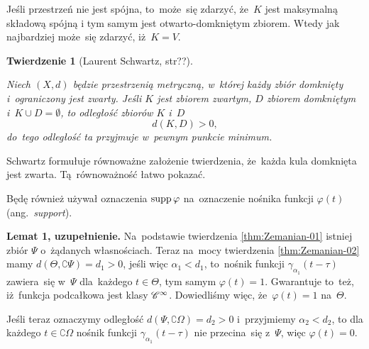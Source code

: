\documentclass[a4paper,11pt]{article}
\numberwithin{equation}{section}
\newtheorem{theorem}{Twierdzenie}
\begin{document}
Jeśli przestrzeń nie jest spójna, to~może~się zdarzyć, że~$K$ jest
maksymalną składową spójną i tym samym jest otwarto-domkniętym
zbiorem. Wtedy jak najbardziej może~się zdarzyć, iż~$K = V$.





\begin{theorem}[Laurent Schwartz,
  str??\cite{SchwartzKursAnalizyMatematycznejVolI1979}]
  \label{thm:Zemanian-02}

  Niech $( X, d )$ będzie przestrzenią metryczną, w~której każdy zbiór
  domknięty i~ograniczony jest zwarty. Jeśli $K$ jest zbiorem zwartym,
  $D$ zbiorem domkniętym i~$K \cup D = \emptyset$, to odległość zbiorów $K$
  i~$D$
  \begin{equation}
    \label{eq:Zem-s01-05}
    d( K, D ) > 0,
  \end{equation}
  do~tego odległość ta przyjmuje w~pewnym punkcie minimum.

\end{theorem}





\noindent
Schwartz formułuje równoważne założenie twierdzenia, że~każda
kula domknięta jest zwarta. Tą~równoważność łatwo pokazać.

Będę również używał oznaczenia $\operatorname{supp} \varphi$ na~oznaczenie nośnika
funkcji $\varphi( t )$ (ang.~\textit{support}).

\VerSpaceFour





\noindent
{} \textbf{Lemat 1, uzupełnienie.} Na~podstawie twierdzenia
\eqref{thm:Zemanian-01} istniej zbiór $\Psi$ o~żądanych własnościach. Teraz
na~mocy twierdzenia \eqref{thm:Zemanian-02} mamy
$d( \Theta, \complement \Psi ) = d_{ 1 } > 0$, jeśli więc $\alpha_{ 1 } < d_{ 1 }$, to~nośnik funkcji
$\gamma_{ \alpha_{ 1 } }( t - \tau )$ zawiera~się w~$\Psi$ dla~każdego $t \in \Theta$, tym samym
$\varphi( t ) = 1$. Gwarantuje to~też, iż~funkcja podcałkowa jest klasy
$\mathcal{C}^{ \infty }$. Dowiedliśmy więc, że~$\varphi( t ) = 1$ na~$\Theta$.

Jeśli teraz oznaczymy odległość $d( \Psi, \complement \Omega ) = d_{ 2 } > 0$ i~przyjmiemy
$\alpha_{ 2 } < d_{ 2 }$, to dla każdego $t \in \complement \Omega$ nośnik funkcji
$\gamma_{ \alpha_{ 1 } }( t - \tau )$ nie przecina~się z~$\Psi$, więc $\varphi( t ) = 0$.

\VerSpaceFour
\end{document}
